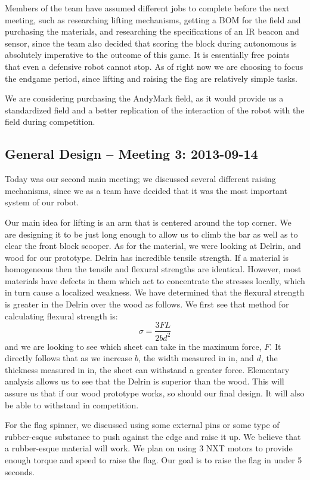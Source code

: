 \documentclass{article}
\begin{document}
Members of the team have assumed different jobs to complete before the next meeting, such as researching lifting mechanisms, getting a BOM for the field and purchasing the materials, and researching the specifications of an IR beacon and sensor, since the team also decided that scoring the block during autonomous is absolutely imperative to the outcome of this game. It is essentially free points that even a defensive robot cannot stop. As of right now we are choosing to focus the endgame period, since lifting and raising the flag are relatively simple tasks. 

We are considering purchasing the AndyMark field, as it would provide us a standardized field and a better replication of the interaction of the robot with the field during competition. 

\newpage
\subsection{General Design -- Meeting 3: 2013-09-14}
Today was our second main meeting; we discussed several different raising mechanisms, since we as a team have decided that it was the most important system of our robot.

Our main idea for lifting is an arm that is centered around the top corner. We are designing it to be just long enough to allow us to climb the bar as well as to clear the front block scooper. As for the material, we were looking at Delrin, and wood for our prototype. Delrin has incredible tensile strength. If a material is homogeneous then the tensile and flexural strengths are identical. However, most materials have defects in them which act to concentrate the stresses locally, which in turn cause a localized weakness. We have determined that the flexural strength is greater in the Delrin over the wood as follows. We first see that method for calculating flexural strength is: \[\sigma = \frac{3FL}{2bd^2}\] and we are looking to see which sheet can take in the maximum force, $F$. It directly follows that as we increase $b$, the width measured in in, and $d$, the  thickness measured in in, the sheet can withstand a greater force. Elementary analysis allows us to see that the Delrin is superior than the wood. This will assure us that if our wood prototype works, so should our final design. It will also be able to withstand in competition. 

For the flag spinner, we discussed using some external pins or some type of rubber-esque substance to push against the edge and raise it up. We believe that a rubber-esque material will work. We plan on using 3 NXT motors to provide enough torque and speed to raise the flag. Our goal is to raise the flag in under 5 seconds. 
\end{document}
